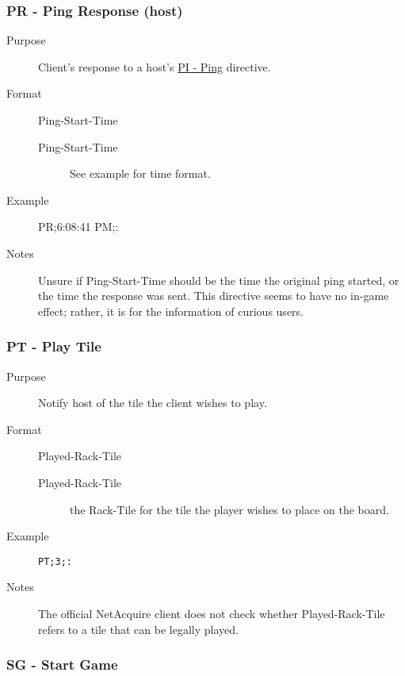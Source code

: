 \documentclass{article}
\providecommand{\wiredata}[1]{\texttt{{#1}}}
\begin{document}

\subsubsection{PR - Ping Response (host)} %
\label{ssub:pr_ping_response_host_}

\begin{description}
  \item[Purpose] Client's response to a host's \hyperref[ssub:pi_ping_client_]{PI - Ping} directive.
  \item[Format] Ping-Start-Time
  \begin{description}
    \item[Ping-Start-Time] See example for time format.
  \end{description}
  \item[Example] PR;6:08:41 PM;:
  \item[Notes] Unsure if Ping-Start-Time should be the time the original ping started, or the time the response was sent. This directive seems to have no in-game effect; rather, it is for the information of curious users.
\end{description}


\subsubsection{PT - Play Tile} %
\label{ssub:pt_play_tile}

\begin{description}
  \item[Purpose] Notify host of the tile the client wishes to play.
  \item[Format] Played-Rack-Tile
  \begin{description}
    \item[Played-Rack-Tile] the Rack-Tile for the tile the player wishes to place on the board.
  \end{description}
  \item[Example] \wiredata{PT;3;:}
  \item[Notes] The official NetAcquire client does not check whether Played-Rack-Tile refers to a tile that can be legally played.
\end{description}


\subsubsection{SG - Start Game} %
\label{ssub:sg_start_game}
\end{document}
